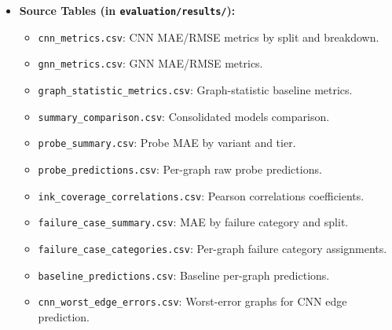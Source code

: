 \documentclass[11pt,letterpaper]{article}
\numberwithin{equation}{section}
\numberwithin{figure}{section}
\numberwithin{table}{section}
\begin{document}
\begin{itemize}
\begin{itemize}
        \item Figure~\ref{fig:probe_mae}: \texttt{probe\_variant\_mae\_comparison.png} - Error comparison (MAE) across the different probe variants.
        \item Figure~\ref{fig:ink_vs_nodes}: \texttt{ink\_coverage\_vs\_node\_count.png} - Scatter plot of ink fraction vs. node count.
        \item Figure~\ref{fig:component_size_vs_nodes}: \texttt{component\_size\_vs\_node\_count.png} - Scatter plot of component area vs. node count.
        \item Figure~\ref{fig:error_vs_nodes}: \texttt{error\_vs\_num\_nodes.png} - Plotting prediction error against physical graph size.
        \item Figure~\ref{fig:error_vs_density}: \texttt{error\_vs\_density.png} - Plotting prediction error against graph density.
        \item Figure~\ref{fig:worst_cases}: \texttt{worst\_case\_image\_grid.png} - Grid of worst-performing outlier images yielding highest regression errors.
    \end{itemize}
    \item \textbf{Source Tables (in \texttt{evaluation/results/}):}
    \begin{itemize}
        \item \texttt{cnn\_metrics.csv}: CNN MAE/RMSE metrics by split and breakdown.
        \item \texttt{gnn\_metrics.csv}: GNN MAE/RMSE metrics.
        \item \texttt{graph\_statistic\_metrics.csv}: Graph-statistic baseline metrics.
        \item \texttt{summary\_comparison.csv}: Consolidated models comparison.
        \item \texttt{probe\_summary.csv}: Probe MAE by variant and tier.
        \item \texttt{probe\_predictions.csv}: Per-graph raw probe predictions.
        \item \texttt{ink\_coverage\_correlations.csv}: Pearson correlations coefficients.
        \item \texttt{failure\_case\_summary.csv}: MAE by failure category and split.
        \item \texttt{failure\_case\_categories.csv}: Per-graph failure category assignments.
        \item \texttt{baseline\_predictions.csv}: Baseline per-graph predictions.
        \item \texttt{cnn\_worst\_edge\_errors.csv}: Worst-error graphs for CNN edge prediction.

\end{itemize}
\end{itemize}
\end{document}
